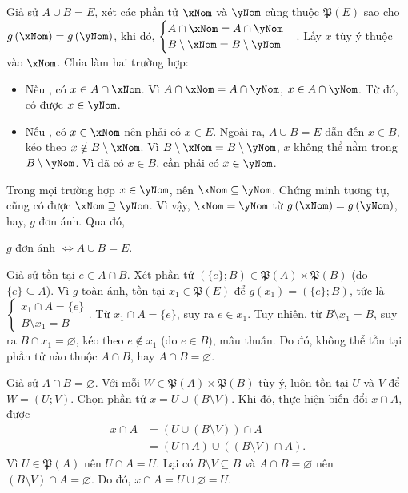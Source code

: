 Giả sử $A \cup B = E$, xét các phần tử $\xNom$ và $\yNom$ cùng thuộc $\mathfrak{P}(E)$ sao cho $g\left(\xNom\right) = g\left(\yNom\right)$, khi đó, $\begin{cases}
   A \cap \xNom = A \cap \yNom \\
   B \setminus \xNom = B \setminus \yNom
\end{cases}$. Lấy $x$ tùy ý thuộc vào $\xNom$. Chia làm hai trường hợp:
\begin{itemize}
   \item Nếu , có $x \in A \cap \xNom$. Vì $A \cap \xNom = A \cap \yNom$, $x \in A \cap \yNom$. Từ đó, có được $x \in \yNom$.
   \item Nếu , có $x \in \xNom$ nên phải có $x \in E$. Ngoài ra, $A \cup B = E$ dẫn đến $x \in B$, kéo theo $x \notin B \setminus \xNom$. Vì $B \setminus \xNom = B \setminus \yNom$, $x$ không thể nằm trong $B \setminus \yNom$. Vì đã có $x \in B$, cần phải có $x \in \yNom$.
\end{itemize}
Trong mọi trường hợp $x \in \yNom$, nên $\xNom \subseteq \yNom$. Chứng minh tương tự, cũng có được $\xNom \supseteq \yNom$. Vì vậy, $\xNom = \yNom$ từ $g\left(\xNom\right) = g\left(\yNom\right)$, hay, $g$ đơn ánh. Qua đó, \begin{center}
   $g$ đơn ánh $\iff A \cup B = E$.
\end{center}

Giả sử tồn tại $e \in A \cap B$. Xét phần tử $(\{e\}; B) \in \mathfrak{P}(A) \times \mathfrak{P}(B)$ (do $\{e\} \subseteq A$). Vì $g$ toàn ánh, tồn tại $x_1 \in \mathfrak{P}(E)$ để $g(x_1) = (\{e\}; B)$, tức là $\begin{cases}
   x_1 \cap A = \{e\} \\
   B \setminus x_1 = B
\end{cases}$. Từ $x_1 \cap A = \{e\}$, suy ra $e \in x_1$. Tuy nhiên, từ $B \setminus x_1 = B$, suy ra $B \cap x_1 = \varnothing$, kéo theo $e \notin x_1$ (do $e \in B$), mâu thuẫn. Do đó, không thể tồn tại phần tử nào thuộc $A \cap B$, hay $A \cap B = \varnothing$.

Giả sử $A \cap B = \varnothing$. Với mỗi $W \in \mathfrak{P}(A) \times \mathfrak{P}(B)$ tùy ý, luôn tồn tại $U$ và $V$ để $W = (U; V)$. Chọn phần tử $x = U \cup (B \setminus V)$. Khi đó, thực hiện biến đổi $x \cap A$, được
\begin{align*}
   x \cap A &= (U \cup (B \setminus V)) \cap A \\
   &= (U \cap A) \cup ((B \setminus V) \cap A).
\end{align*}
Vì $U \in \mathfrak{P}(A)$ nên $U \cap A = U$. Lại có $B \setminus V \subseteq B$ và $A \cap B = \varnothing$ nên $(B \setminus V) \cap A = \varnothing$. Do đó, $x \cap A = U \cup \varnothing = U$.

